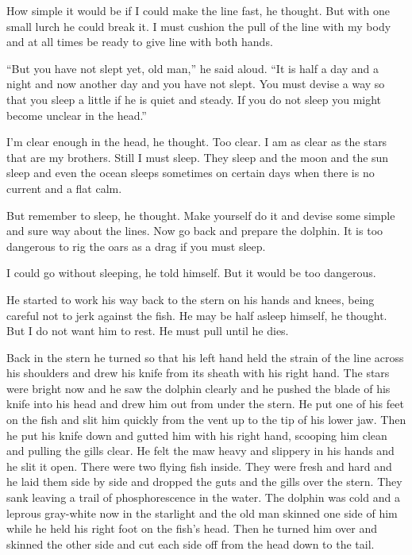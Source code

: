 \documentclass[fontset=ubuntu]{ctexrep}
\newlength{\drop}%
\begin{document}
How simple it would be if I could make the line fast, he thought. But with
one small lurch he could break it. I must \gls{cushion} the pull of the line
with my body and at all times be ready to give line with both hands.

``But you have not slept yet, old man,'' he said aloud. ``It is half a day
and a night and now another day and you have not slept. You must
\gls{devise} a way so that you sleep a little if he is quiet and steady. If
you do not sleep you might become unclear in the head.''

I'm clear enough in the head, he thought. Too clear. I am as clear as the
stars that are my brothers. Still I must sleep. They sleep and the moon and
the sun sleep and even the ocean sleeps sometimes on certain days when there
is no current and a flat calm.

But remember to sleep, he thought. Make yourself do it and devise some
simple and sure way about the lines. Now go back and prepare the dolphin. It
is too dangerous to \gls{rig} the oars as a drag if you must sleep.

I could go without sleeping, he told himself. But it would be too dangerous.

He started to work his way back to the stern on his hands and knees, being
careful not to jerk against the fish. He may be half asleep himself, he
thought. But I do not want him to rest. He must pull until he dies.

Back in the stern he turned so that his left hand held the strain of the
line across his shoulders and drew his knife from its sheath with his right
hand. The stars were bright now and he saw the dolphin clearly and he pushed
the blade of his knife into his head and drew him out from under the stern.
He put one of his feet on the fish and \gls{slit} him quickly from the
\gls{vent} up to the \gls{tip} of his lower jaw. Then he put his knife down
and \gls{gutted} him with his right hand, scooping him clean and pulling the
\glspl{gill} clear. He felt the \gls{maw} heavy and \gls{slippery} in his
hands and he slit it open. There were two flying fish inside. They were
fresh and hard and he laid them side by side and dropped the guts and the
gills over the stern. They \gls{sank} leaving a trail of phosphorescence in the
water. The dolphin was cold and a leprous gray-white now in the starlight
and the old man skinned one side of him while he held his right foot on the
fish's head. Then he turned him over and skinned the other side and cut each
side off from the head down to the tail.
\end{document}
